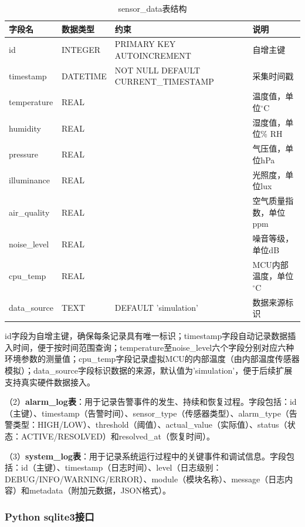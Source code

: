 \documentclass[12pt,a4paper]{ctexart}
\begin{document}
\begin{table}[H]
    \centering
    \caption{sensor\_data表结构}
    \label{tab:sensor_data}
    \begin{tabular}{@{}lllp{5cm}@{}}
        \toprule
        \textbf{字段名} & \textbf{数据类型} & \textbf{约束} & \textbf{说明} \\
        \midrule
        id & INTEGER & PRIMARY KEY AUTOINCREMENT & 自增主键 \\
        timestamp & DATETIME & NOT NULL DEFAULT CURRENT\_TIMESTAMP & 采集时间戳 \\
        temperature & REAL & & 温度值，单位$^\circ$C \\
        humidity & REAL & & 湿度值，单位\% RH \\
        pressure & REAL & & 气压值，单位hPa \\
        illuminance & REAL & & 光照度，单位lux \\
        air\_quality & REAL & & 空气质量指数，单位ppm \\
        noise\_level & REAL & & 噪音等级，单位dB \\
        cpu\_temp & REAL & & MCU内部温度，单位$^\circ$C \\
        data\_source & TEXT & DEFAULT 'simulation' & 数据来源标识 \\
        \bottomrule
    \end{tabular}
\end{table}

id字段为自增主键，确保每条记录具有唯一标识；timestamp字段自动记录数据插入时间，便于按时间范围查询；temperature至noise\_level六个字段分别对应六种环境参数的测量值；cpu\_temp字段记录虚拟MCU的内部温度（由内部温度传感器模拟）；data\_source字段标识数据的来源，默认值为'simulation'，便于后续扩展支持真实硬件数据接入。

（2）\textbf{alarm\_log表}：用于记录告警事件的发生、持续和恢复过程。字段包括：id（主键）、timestamp（告警时间）、sensor\_type（传感器类型）、alarm\_type（告警类型：HIGH/LOW）、threshold（阈值）、actual\_value（实际值）、status（状态：ACTIVE/RESOLVED）和resolved\_at（恢复时间）。

（3）\textbf{system\_log表}：用于记录系统运行过程中的关键事件和调试信息。字段包括：id（主键）、timestamp（日志时间）、level（日志级别：DEBUG/INFO/WARNING/ERROR）、module（模块名称）、message（日志内容）和metadata（附加元数据，JSON格式）。

\subsubsection{Python sqlite3接口}
\end{document}
